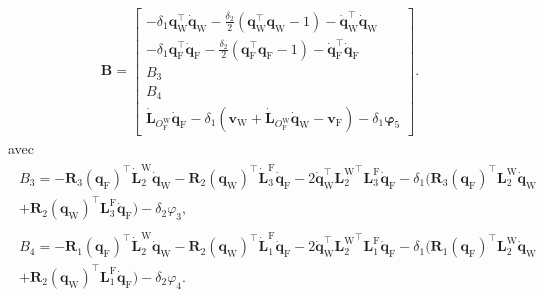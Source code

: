 \begin{align}
    \label{eq:b_contraint}
    \boldsymbol{B} = \begin{bmatrix}
            -\delta_{1} \boldsymbol{q}_{\text{W}}^\top \dot{\boldsymbol{q}}_{\text{W}} - \frac{\delta_{2}}{2} (\boldsymbol{q}_{\text{W}}^\top \boldsymbol{q}_{\text{W}} -1) - \dot{\boldsymbol{q}}_{\text{W}}^\top \dot{\boldsymbol{q}}_{\text{W}} \\
            -\delta_{1} \boldsymbol{q}_{\text{F}}^\top \dot{\boldsymbol{q}}_{\text{F}} - \frac{\delta_{2}}{2} (\boldsymbol{q}_{\text{F}}^\top \boldsymbol{q}_{\text{F}} -1) - \dot{\boldsymbol{q}}_{\text{F}}^\top \dot{\boldsymbol{q}}_{\text{F}} \\
            B_{3}\\
            B_{4}\\
            \dot{\boldsymbol{L}}_{O_{\text{F}}^{\text{W}}} \dot{\boldsymbol{q}}_{\text{F}}  - \delta_{1}( \boldsymbol{v}_{\text{W}} + \dot{\boldsymbol{L}}_{O_{\text{F}}^{\text{W}}} \dot{\boldsymbol{q}}_{\text{W}} - \boldsymbol{v}_{\text{F}}) - \delta_{1}\boldsymbol{\varphi}_{5}
        \end{bmatrix}.
\end{align}
avec 
\begin{align*}
    \begin{split}
        B_{3} = -\boldsymbol{R}_{3}(\boldsymbol{q}_{\text{F}})^\top \dot{\boldsymbol{L}}_{2}^{\text{W}}\dot{\boldsymbol{q}}_{\text{W}} - \boldsymbol{R}_{2}(\boldsymbol{q}_{\text{W}})^\top \dot{\boldsymbol{L}}_{3}^{\text{F}} \dot{\boldsymbol{q}}_{\text{F}} - 2\dot{\boldsymbol{q}}_{\text{W}}^\top {\boldsymbol{L}_{2}^{\text{W}}}^\top \boldsymbol{L}_{3}^{\text{F}} \dot{\boldsymbol{q}}_{\text{F}} - \delta_{1}(\boldsymbol{R}_{3}(\boldsymbol{q}_{\text{F}})^\top \boldsymbol{L}_{2}^{\text{W}}\dot{\boldsymbol{q}}_{\text{W}} \\+  \boldsymbol{R}_{2}(\boldsymbol{q}_{\text{W}})^\top \boldsymbol{L}_{3}^{\text{F}} \dot{\boldsymbol{q}}_{\text{F}} ) - \delta_{2}\varphi_{3},
    \end{split}\\
        \begin{split}
        B_{4} = -\boldsymbol{R}_{1}(\boldsymbol{q}_{\text{F}})^\top \dot{\boldsymbol{L}}_{2}^{\text{W}}\dot{\boldsymbol{q}}_{\text{W}} - \boldsymbol{R}_{2}(\boldsymbol{q}_{\text{W}})^\top \dot{\boldsymbol{L}}_{1}^{\text{F}} \dot{\boldsymbol{q}}_{\text{F}} - 2\dot{\boldsymbol{q}}_{\text{W}}^\top {\boldsymbol{L}_{2}^{\text{W}}}^\top \boldsymbol{L}_{1}^{\text{F}} \dot{\boldsymbol{q}}_{\text{F}} - \delta_{1}(\boldsymbol{R}_{1}(\boldsymbol{q}_{\text{F}})^\top \boldsymbol{L}_{2}^{\text{W}}\dot{\boldsymbol{q}}_{\text{W}} \\+  \boldsymbol{R}_{2}(\boldsymbol{q}_{\text{W}})^\top \boldsymbol{L}_{1}^{\text{F}} \dot{\boldsymbol{q}}_{\text{F}} ) - \delta_{2} \varphi_{4}.
    \end{split}
\end{align*}

